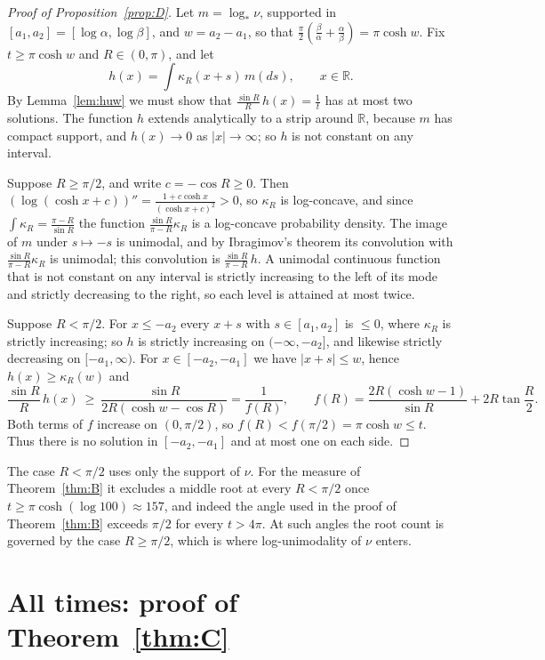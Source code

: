 \documentclass[11pt]{amsart}
\theoremstyle{remark}
\newcommand{\R}{\mathbb R}
\begin{document}
\begin{proof}[Proof of Proposition~\ref{prop:D}]
Let $m=\log_*\nu$, supported in $[a_1,a_2]=[\log\alpha,\log\beta]$, and $w=a_2-a_1$, so that $\frac\pi2(\frac\beta\alpha+\frac\alpha\beta)=\pi\cosh w$. Fix $t\ge\pi\cosh w$ and $R\in(0,\pi)$, and let
\[
h(x)=\int\kappa_R(x+s)\,m(ds),\qquad x\in\R .
\]
By Lemma~\ref{lem:huw} we must show that $\frac{\sin R}R\,h(x)=\frac1t$ has at most two solutions. The function $h$ extends analytically to a strip around $\R$, because $m$ has compact support, and $h(x)\to0$ as $|x|\to\infty$; so $h$ is not constant on any interval.

Suppose $R\ge\pi/2$, and write $c=-\cos R\ge0$. Then $(\log(\cosh x+c))''=\frac{1+c\cosh x}{(\cosh x+c)^2}>0$, so $\kappa_R$ is log-concave, and since $\int\kappa_R=\frac{\pi-R}{\sin R}$ the function $\frac{\sin R}{\pi-R}\kappa_R$ is a log-concave probability density. The image of $m$ under $s\mapsto-s$ is unimodal, and by Ibragimov's theorem \cite{Ibr56} its convolution with $\frac{\sin R}{\pi-R}\kappa_R$ is unimodal; this convolution is $\frac{\sin R}{\pi-R}\,h$. A unimodal continuous function that is not constant on any interval is strictly increasing to the left of its mode and strictly decreasing to the right, so each level is attained at most twice.

Suppose $R<\pi/2$. For $x\le-a_2$ every $x+s$ with $s\in[a_1,a_2]$ is $\le0$, where $\kappa_R$ is strictly increasing; so $h$ is strictly increasing on $(-\infty,-a_2]$, and likewise strictly decreasing on $[-a_1,\infty)$. For $x\in[-a_2,-a_1]$ we have $|x+s|\le w$, hence $h(x)\ge\kappa_R(w)$ and
\[
\frac{\sin R}R\,h(x)\ \ge\ \frac{\sin R}{2R(\cosh w-\cos R)}=\frac1{f(R)},\qquad f(R)=\frac{2R(\cosh w-1)}{\sin R}+2R\tan\frac R2 .
\]
Both terms of $f$ increase on $(0,\pi/2)$, so $f(R)<f(\pi/2)=\pi\cosh w\le t$. Thus there is no solution in $[-a_2,-a_1]$ and at most one on each side.
\end{proof}

The case $R<\pi/2$ uses only the support of $\nu$. For the measure of Theorem~\ref{thm:B} it excludes a middle root at every $R<\pi/2$ once $t\ge\pi\cosh(\log100)\approx157$, and indeed the angle used in the proof of Theorem~\ref{thm:B} exceeds $\pi/2$ for every $t>4\pi$. At such angles the root count is governed by the case $R\ge\pi/2$, which is where log-unimodality of $\nu$ enters.

\section{All times: proof of \texorpdfstring{Theorem~\ref{thm:C}}{Theorem C}}\label{sec:C}
\end{document}
